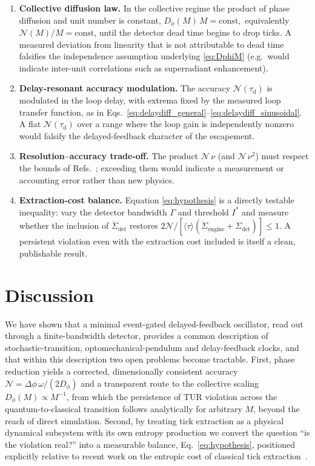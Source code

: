 \documentclass[aps,pre,reprint,amsmath,amssymb,floatfix,nofootinbib]{revtex4-2}
\newcommand{\avg}[1]{\langle #1 \rangle}
\newcommand{\Sdot}{\dot{\Sigma}}
\newcommand{\Dphi}{D_{\phi}}
\newcommand{\taud}{\tau_{\mathrm{d}}}
\begin{document}
\begin{enumerate}
\item \textbf{Collective diffusion law.}
In the collective regime the product of phase diffusion and unit number
is constant,
\(
  \Dphi(M)\,M = \mathrm{const},
\)
equivalently $\mathcal{N}(M)/M=\mathrm{const}$, until the detector dead
time begins to drop ticks. A measured deviation from linearity that is
not attributable to dead time falsifies the independence assumption
underlying \eqref{eq:DphiM} (e.g.\ would indicate inter-unit
correlations such as superradiant enhancement).

\item \textbf{Delay-resonant accuracy modulation.}
The accuracy $\mathcal{N}(\taud)$ is modulated in the loop
delay, with extrema fixed by the measured loop transfer function, as in
Eqs.~\eqref{eq:delaydiff_general}--\eqref{eq:delaydiff_sinusoidal}. A flat $\mathcal{N}(\taud)$ over a range where the loop gain is independently nonzero would falsify the
delayed-feedback character of the escapement.

\item \textbf{Resolution--accuracy trade-off.}
The product $\mathcal{N}\,\nu$ (and $\mathcal{N}\,\nu^2$) must respect the
bounds of Refs.~\cite{Meier2023,Prech2025}; exceeding them would indicate
a measurement or accounting error rather than new physics.

\item \textbf{Extraction-cost balance.}
Equation \eqref{eq:hypothesis} is a directly testable inequality: vary
the detector bandwidth $\Gamma$ and threshold $I^\ast$ and measure
whether the inclusion of $\Sdot_{\mathrm{det}}$ restores
$2\mathcal{N}/[\avg{\tau}(\Sdot_{\mathrm{engine}}+\Sdot_{\mathrm{det}})]\le1$.
A persistent violation even with the extraction cost included is itself a
clean, publishable result.
\end{enumerate}

\section{Discussion}
\label{sec:discussion}

We have shown that a minimal event-gated delayed-feedback oscillator,
read out through a finite-bandwidth detector, provides a common
description of stochastic-transition, optomechanical-pendulum and
delay-feedback clocks, and that within this description two open problems
become tractable. First, phase reduction yields a corrected,
dimensionally consistent accuracy
$\mathcal{N}=\Delta\phi\,\omega/(2\Dphi)$ and a transparent route to the
collective scaling $\Dphi(M)\propto M^{-1}$, from which the persistence
of TUR violation across the quantum-to-classical transition follows
analytically for arbitrary $M$, beyond the reach of direct simulation.
Second, by treating tick extraction as a physical dynamical subsystem
with its own entropy production we convert the question ``is the
violation real?'' into a measurable balance, Eq.~\eqref{eq:hypothesis},
positioned explicitly relative to recent work on the entropic cost of
classical tick extraction~\cite{Wadhia2025}.
\end{document}
